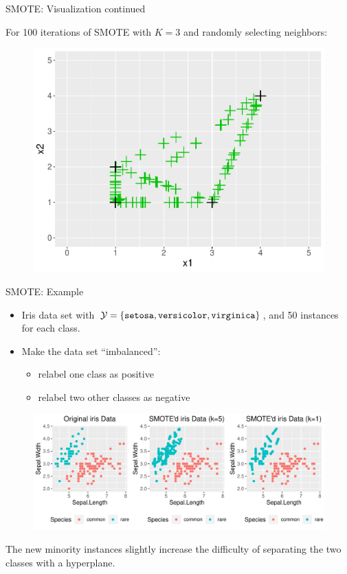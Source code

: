 \documentclass[11pt,compress,t,notes=noshow, xcolor=table]{beamer}
\begin{document}
\begin{frame}{SMOTE: Visualization continued}	

    For 100 iterations of SMOTE with $K=3$ and randomly selecting neighbors:

    \begin{figure}
        \centering
        \includegraphics[width=0.8\linewidth]{figure_man/smote_viz_12.pdf}
    \end{figure}
	
\end{frame}
    
\begin{frame}{SMOTE: Example}
    
    \begin{itemize}
        \item Iris data set with $\mathcal{Y}=\{ \texttt{setosa},\texttt{versicolor},\texttt{virginica}  \}$, and 50 instances for each class.
        
        \item Make the data set ``imbalanced'': 
        \begin{itemize}
            \item relabel one class as positive
            \item relabel two other classes as negative
        \end{itemize}
    \end{itemize}		

    \begin{figure}
        \centering
        \includegraphics[width=0.9\linewidth]{figure_man/smoted_iris_data_ggplot.pdf}
    \end{figure}
		
    The new minority instances slightly increase the difficulty of separating the two classes with a hyperplane.
	
\end{frame}
\end{document}
